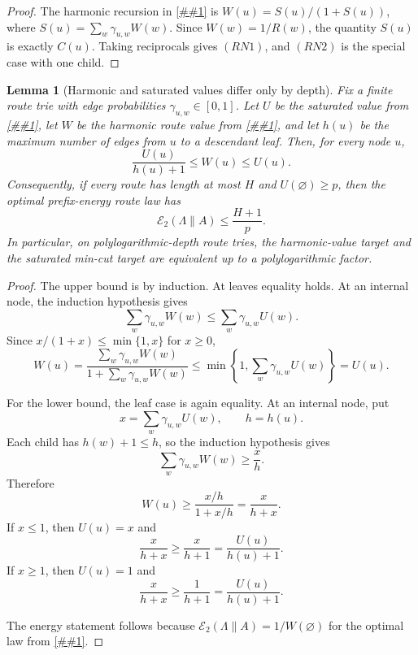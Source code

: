 \documentclass[10pt]{article}
\newcommand{\cref}[1]{\ref{##1}}
\newtheorem{lemma}[theorem]{Lemma}
\theoremstyle{definition}
\begin{document}
\begin{proof}
   The harmonic recursion in \cref{lem:optimal-prefix-energy-law} is
   \(W(u)=S(u)/(1+S(u))\), where
   \(S(u)=\sum_w\gamma_{u,w}W(w)\).  Since \(W(w)=1/R(w)\), the quantity
   \(S(u)\) is exactly \(C(u)\).  Taking reciprocals gives \((RN1)\), and
   \((RN2)\) is the special case with one child.
\end{proof}

\begin{lemma}[Harmonic and saturated values differ only by depth]\label{lem:harmonic-saturated-comparison}
   Fix a finite route trie with edge probabilities $\gamma_{u,w}\in[0,1]$.
   Let $U$ be the saturated value from
   \cref{lem:saturated-value-recursion}, let $W$ be the harmonic route value
   from \cref{lem:optimal-prefix-energy-law}, and let $h(u)$ be the maximum
   number of edges from $u$ to a descendant leaf. Then, for every node $u$,
   \[
      \frac{U(u)}{h(u)+1}\le W(u)\le U(u).
   \]
   Consequently, if every route has length at most $H$ and
   $U(\varnothing)\ge p$, then the optimal prefix-energy route law has
   \[
      \mathcal E_2(\Lambda\|A)
      \le
      \frac{H+1}{p}.
   \]
   In particular, on polylogarithmic-depth route tries, the harmonic-value
   target and the saturated min-cut target are equivalent up to a
   polylogarithmic factor.
\end{lemma}

\begin{proof}
   The upper bound is by induction. At leaves equality holds. At an internal
   node, the induction hypothesis gives
   \[
      \sum_w\gamma_{u,w}W(w)
      \le
      \sum_w\gamma_{u,w}U(w).
   \]
   Since $x/(1+x)\le\min\{1,x\}$ for $x\ge0$,
   \[
      W(u)
      =
      \frac{\sum_w\gamma_{u,w}W(w)}
           {1+\sum_w\gamma_{u,w}W(w)}
      \le
      \min\left\{1,\sum_w\gamma_{u,w}U(w)\right\}
      =
      U(u).
   \]

   For the lower bound, the leaf case is again equality. At an internal node,
   put
   \[
      x=\sum_w\gamma_{u,w}U(w),
      \qquad
      h=h(u).
   \]
   Each child has $h(w)+1\le h$, so the induction hypothesis gives
   \[
      \sum_w\gamma_{u,w}W(w)
      \ge
      \frac{x}{h}.
   \]
   Therefore
   \[
      W(u)\ge \frac{x/h}{1+x/h}=\frac{x}{h+x}.
   \]
   If $x\le1$, then $U(u)=x$ and
   \[
      \frac{x}{h+x}\ge\frac{x}{h+1}=\frac{U(u)}{h(u)+1}.
   \]
   If $x\ge1$, then $U(u)=1$ and
   \[
      \frac{x}{h+x}\ge\frac1{h+1}=\frac{U(u)}{h(u)+1}.
   \]

   The energy statement follows because
   $\mathcal E_2(\Lambda\|A)=1/W(\varnothing)$ for the optimal law from
   \cref{lem:optimal-prefix-energy-law}.
\end{proof}
\end{document}
